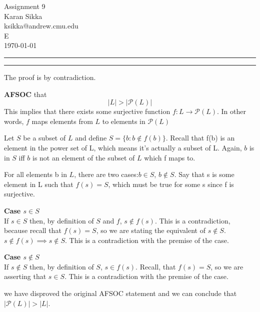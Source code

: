 \documentclass[11pt]{article}
\makeatletter
\newcounter{questionCounter}
\newcounter{partCounter}[questionCounter]
\newenvironment{question}[2][\arabic{questionCounter}]{%
    \setcounter{partCounter}{0}%
    \vspace{.25in} \hrule \vspace{0.5em}%
        \noindent{\bf #2}%
    \vspace{0.8em} \hrule \vspace{.10in}%
    \addtocounter{questionCounter}{1}%
}{}
\newcommand{\myname}{Karan Sikka}
\newcommand{\myandrew}{ksikka@andrew.cmu.edu}
\newcommand{\myhwname}{Assignment 9}
\newcommand{\myrecitation}{E}
\makeatother
\begin{document}
\thispagestyle{plain}

\begin{center}
{\Large \myhwname} \\
\myname \\
\myandrew \\
\myrecitation \\
\today
\end{center}
\begin{question}{Love}
The proof is by contradiction.

\textbf{AFSOC} that $$|L| > |\mathcal{P}(L)|$$ 
This implies that there exists some surjective function $f:L \rightarrow\mathcal{P}(L)$.
In other words, $f$ maps elements from $L$ to elements in $\mathcal{P}(L)$

Let $S$ be a subset of $L$ and define $S = \{b:b \notin f(b)\}$. 
Recall that f(b) is an element in the power set of L, which means it's
actually a subset of L. Again, $b$ is in $S$ iff $b$ is not an element of
the subset of $L$ which f maps to.

For all elements b in $L$, there are two cases:$b \in S$, $b \not\in S$. Say that s
is some element in L such that $f(s) = S$, which must be true for some s
since f is surjective. 

\textbf{Case  $s \in S$}\\
If $s \in S$ then, by definition of $S$ and $f$, $s \notin f(s)$.
This is a contradiction, because recall that $f(s) = S$, 
so  we are stating the equivalent of $s \notin
S$. $s \notin f(s) \implies s\notin S$. This is a contradiction
with the premise of the case.

\textbf{Case  $s \notin S$}\\
If $s \notin S$ then, by definition of $S$, $s \in f(s)$. Recall,
that $f(s) = S$, so we are asserting that $s \in
S$. This is a contradiction with the premise of the case.

we have disproved the original AFSOC statement and we 
can conclude that $|\mathcal{P}(L)| > |L|$.
\end{question}
\end{document}
